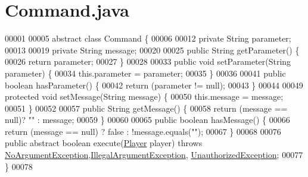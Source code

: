 \hypertarget{Command_8java_source}{\section{Command.\-java}
}

\begin{DoxyCode}
00001 
00005 \textcolor{keyword}{abstract} \textcolor{keyword}{class }Command \{
00006 
00012     \textcolor{keyword}{private} String parameter;
00013 
00019     \textcolor{keyword}{private} String message;
00020 
00025     \textcolor{keyword}{public} String getParameter() \{
00026         \textcolor{keywordflow}{return} parameter;
00027     \}
00028 
00033     \textcolor{keyword}{public} \textcolor{keywordtype}{void} setParameter(String parameter) \{
00034         this.parameter = parameter;
00035     \}
00036 
00041     \textcolor{keyword}{public} \textcolor{keywordtype}{boolean} hasParameter() \{
00042         \textcolor{keywordflow}{return} (parameter != null);
00043     \}
00044 
00049     \textcolor{keyword}{protected} \textcolor{keywordtype}{void} setMessage(String message) \{
00050         this.message = message;
00051     \}
00052 
00057     \textcolor{keyword}{public} String getMessage() \{
00058         \textcolor{keywordflow}{return} (message == null)? \textcolor{stringliteral}{""} : message;
00059     \}
00060 
00065     \textcolor{keyword}{public} \textcolor{keywordtype}{boolean} hasMessage() \{
00066         \textcolor{keywordflow}{return} (message == null) ? \textcolor{keyword}{false} : !message.equals(\textcolor{stringliteral}{""});
00067     \}
00068 
00076     \textcolor{keyword}{public} \textcolor{keyword}{abstract} \textcolor{keywordtype}{boolean} execute(\hyperlink{classPlayer}{Player} player) \textcolor{keywordflow}{throws} 
      \hyperlink{classNoArgumentException}{NoArgumentException},\hyperlink{classIllegalArgumentException}{IllegalArgumentException},
      \hyperlink{classUnauthorizedException}{UnauthorizedException};
00077 \}
00078 
\end{DoxyCode}
